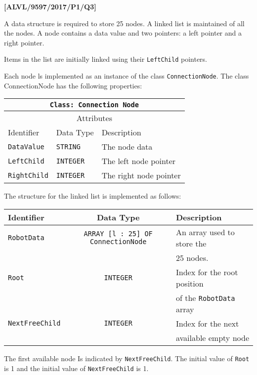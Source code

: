 \item \textbf{{[}ALVL/9597/2017/P1/Q3{]} }

A data structure is required to store 25 nodes. A linked list is maintained
of all the nodes. A node contains a data value and two pointers: a
left pointer and a right pointer. 

Items in the list are initially linked using their \texttt{LeftChild}
pointers. 

Each node ls implemented as an instance of the class \texttt{ConnectionNode}.
The class ConnectionNode has the following properties: 
\begin{center}
\begin{tabular}{|l|l|l|}
\hline 
\multicolumn{3}{|c|}{\texttt{Class: Connection Node}}\tabularnewline
\hline 
\multicolumn{3}{|c|}{Attributes}\tabularnewline
\hline 
\texttt{\hspace{0.01\columnwidth}}Identifier & \texttt{\hspace{0.01\columnwidth}}Data Type & \texttt{\hspace{0.05\columnwidth}}Description\tabularnewline
\hline 
\texttt{DataValue} & \texttt{STRING} & The node data\tabularnewline
\hline 
\texttt{LeftChild} & \texttt{INTEGER} & The left node pointer \tabularnewline
\hline 
\texttt{RightChild} & \texttt{INTEGER} & The right node pointer\tabularnewline
\hline 
\end{tabular}
\par\end{center}

The structure for the linked list is implemented as follows: 
\begin{center}
\begin{tabular}{|l|c|l|}
\hline 
\texttt{\hspace{0.01\columnwidth}}Identifier & Data Type & \texttt{\hspace{0.05\columnwidth}}Description\tabularnewline
\hline 
\texttt{RobotData} & \texttt{ARRAY {[}l : 25{]} OF ConnectionNode} & An array used to store the\tabularnewline
 &  & 25 nodes.\tabularnewline
\hline 
\texttt{Root} & \texttt{INTEGER} & Index for the root position \tabularnewline
 &  & of the \texttt{RobotData} array\tabularnewline
\hline 
\texttt{NextFreeChild} & \texttt{INTEGER} & Index for the next \tabularnewline
 &  & available empty node\tabularnewline
\hline 
\end{tabular}
\par\end{center}

The first available node Is indicated by \texttt{NextFreeChild}. The
initial value of \texttt{Root} is 1 and the initial value of \texttt{NextFreeChild}
is 1.

